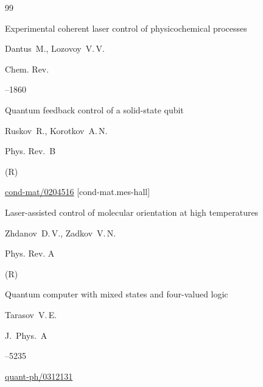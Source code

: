 \begin{thebibliography}{99}

\paper Experimental coherent laser control of physicochemical proces\-ses

\by Dantus~M., Lozovoy~V.\,V.

\jour Chem. Rev.




--1860








\paper Quantum feedback control of a solid-state qubit

\by Ruskov~R., Korotkov~A.\,N.

\jour Phys. Rev.~B




(R)


\arxiv \href{http://arxiv.org/abs/cond-mat/0204516}{cond-mat/0204516} [cond-mat.mes-hall]




\paper Laser-assisted control of molecular orientation at high tempe\-ratures

\by Zhdanov~D.\,V., Zadkov~V.\,N.

\jour Phys. Rev. A




(R)





\paper Quantum computer with mixed states and four-valued logic

\by Tarasov~V.\,E.

\jour J.~Phys.~A




--5235

\arxiv \href{http://arxiv.org/abs/quant-ph/0312131}{quant-ph/0312131}






\end{thebibliography}
